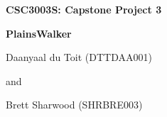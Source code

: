 %

\vspace*{40mm}

\begin{center}

{\Large \bf CSC3003S: Capstone Project 3}


{\LARGE \bf PlainsWalker}

\vspace{20mm}

{\Large Daanyaal du Toit (DTTDAA001)}

and

{\Large Brett Sharwood (SHRBRE003)}

\vspace{10mm}

\end{center}